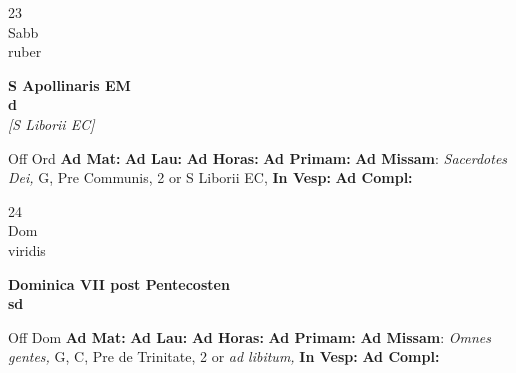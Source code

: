 \documentclass[10pt, openany]{book}
\begin{document}
    \begin{center}
        \begin{minipage}{3.5in}
            \vspace{2em}
            \begin{minipage}{0.5in}
                {\Huge 23} \\
                {\normalsize Sabb} \\
                {\normalsize ruber}
            \end{minipage}
            \begin{minipage}{3.0in}
                \textbf{ \large S Apollinaris EM \\
                \textnormal{\normalsize d}} \\ \textit{[S Liborii EC]} \\ 
            \end{minipage}
            \begin{justify}Off Ord
                \textbf{Ad Mat: }
                \textbf{Ad Lau: }
                \textbf{Ad Horas: }
                \textbf{Ad Primam: }\textbf{Ad Missam}: \textit{Sacerdotes Dei,} G, Pre Communis, 2 or S Liborii EC,  
                \textbf{In Vesp: }
                \textbf{Ad Compl: }
            \end{justify}
        \end{minipage}
    \end{center}

    \begin{center}
        \begin{minipage}{3.5in}
            \vspace{2em}
            \begin{minipage}{0.5in}
                {\Huge 24} \\
                {\normalsize Dom} \\
                {\normalsize viridis}
            \end{minipage}
            \begin{minipage}{3.0in}
                \textbf{ \large Dominica VII post Pentecosten \\
                \textnormal{\normalsize sd}} \\ 
            \end{minipage}
            \begin{justify}Off Dom
                \textbf{Ad Mat: }
                \textbf{Ad Lau: }
                \textbf{Ad Horas: }
                \textbf{Ad Primam: }\textbf{Ad Missam}: \textit{Omnes gentes,} G, C, Pre de Trinitate, 2 or \textit{ad libitum,}  
                \textbf{In Vesp: }
                \textbf{Ad Compl: }
            \end{justify}
        \end{minipage}
    \end{center}
\end{document}

